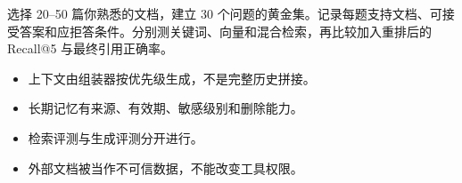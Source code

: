\begin{practice}[做一个带引用的个人知识库]
选择 20--50 篇你熟悉的文档，建立 30 个问题的黄金集。记录每题支持文档、可接受答案和应拒答条件。分别测关键词、向量和混合检索，再比较加入重排后的 Recall@5 与最终引用正确率。
\end{practice}

\begin{checkpoint}
\begin{itemize}
  \item \checkbox 上下文由组装器按优先级生成，不是完整历史拼接。
  \item \checkbox 长期记忆有来源、有效期、敏感级别和删除能力。
  \item \checkbox 检索评测与生成评测分开进行。
  \item \checkbox 外部文档被当作不可信数据，不能改变工具权限。
\end{itemize}
\end{checkpoint}

